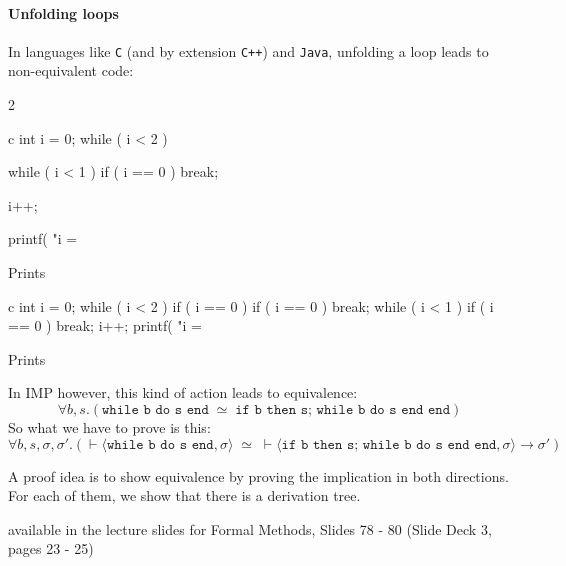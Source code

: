 \paragraph{Unfolding loops}
In languages like \texttt{C} (and by extension \texttt{C++}) and \texttt{Java}, unfolding a loop leads to non-equivalent code:

\begin{multicols}{2}
    \begin{code}{c}
        int i = 0;
        while ( i < 2 ) {


            while ( i < 1 )
                if ( i == 0 ) break;

            i++;
        }
        printf( "i = %
    \end{code}
    Prints 
    \begin{code}{c}
        int i = 0;
        while ( i < 2 ) {
            if ( i == 0 ) {
                if ( i == 0 ) break;
                while ( i < 1 )
                    if ( i == 0 ) break;
            }
            i++;
        }
        printf( "i = %
    \end{code}
    Prints 
\end{multicols}

In IMP however, this kind of action leads to equivalence:
\[
    \forall b, s.(\texttt{while b do s end} \; \simeq \; \texttt{if b then s; while b do s end end})
\]
So what we have to prove is this:
\[
    \forall b, s, \sigma, \sigma'.(\vdash \langle \texttt{while b do s end}, \sigma \rangle \; \simeq \;
    \vdash \langle \texttt{if b then s; while b do s end end}, \sigma \rangle \rightarrow \sigma')
\]

A proof idea is to show equivalence by proving the implication in both directions. For each of them, we show that there is a derivation tree.

\inlineproof available in the lecture slides for Formal Methods, Slides 78 - 80 (Slide Deck 3, pages 23 - 25)
